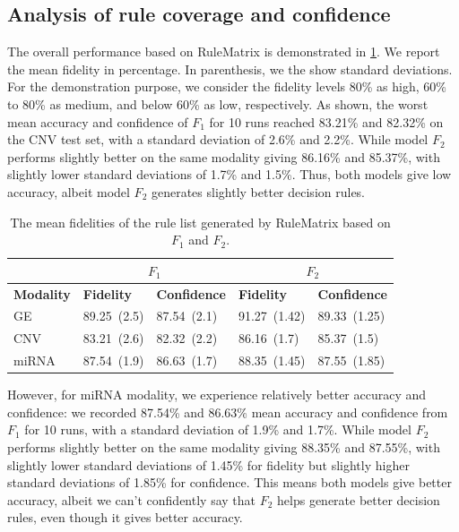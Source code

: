 \subsection{Analysis of rule coverage and confidence}
The overall performance based on RuleMatrix is demonstrated in \cref{table:rules_overall_result}. We report the mean fidelity in percentage. In parenthesis, we the show standard deviations. For the demonstration purpose, we consider the fidelity levels 80\% as high, 60\% to 80\% as medium, and below 60\% as low, respectively. As shown, the worst mean accuracy and confidence of $F_1$ for 10 runs reached 83.21\% and 82.32\% on the CNV test set, with a standard deviation of 2.6\% and 2.2\%. While model $F_2$ performs slightly better on the same modality giving 86.16\% and 85.37\%, with slightly lower standard deviations of 1.7\% and 1.5\%. Thus, both models give low accuracy, albeit model $F_2$ generates slightly better decision rules. 

\begin{table}[h!]
    \centering
    \caption{The mean fidelities of the rule list generated by RuleMatrix based on $F_1$ and $F_2$.}
    \label{table:rules_overall_result}
    \vspace{-2mm}
    \scriptsize{
    \begin{tabular}{l|l|l|l|l} 
        \hline
         & \multicolumn{2}{c|}{$F_1$} & \multicolumn{2}{c}{$F_2$} \\ 
        \hline
        \textbf{Modality} & \textbf{Fidelity} & \textbf{Confidence} & \textbf{Fidelity} & \textbf{Confidence} \\ 
        \hline
        GE  & 89.25~(2.5) & 87.54~(2.1) & 91.27~(1.42) & 89.33~(1.25) \\ 
        \cline{1-3}\cline{4-5}
        CNV & 83.21~(2.6) & 82.32~(2.2) & 86.16~(1.7) & 85.37~(1.5) \\ 
        \hline
        miRNA & 87.54~(1.9) & 86.63~(1.7) & 88.35~(1.45) & 87.55~(1.85) \\
        \hline
    \end{tabular}}
    \vspace{-4mm}
\end{table}

However, for miRNA modality, we experience relatively better accuracy and confidence: we recorded 87.54\% and 86.63\% mean accuracy and confidence from $F_1$ for 10 runs, with a standard deviation of 1.9\% and 1.7\%. While model $F_2$ performs slightly better on the same modality giving 88.35\% and 87.55\%, with slightly lower standard deviations of 1.45\% for fidelity but slightly higher standard deviations of 1.85\% for confidence. This means both models give better accuracy, albeit we can't confidently say that $F_2$ helps generate better decision rules, even though it gives better accuracy. 

